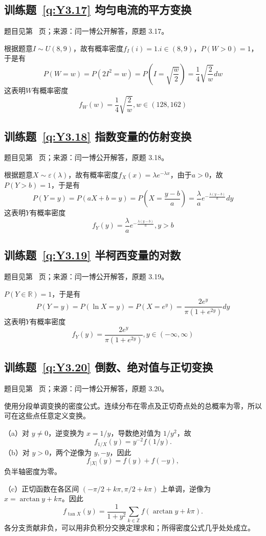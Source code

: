 \documentclass[UTF8,12pt,a4paper,fontset=fandol]{ctexbook}
\begin{document}
\subsection*{训练题~\ref{q:Y3.17} 均匀电流的平方变换}\label{a:Y3.17}{\small 题目见第~\pageref{q:Y3.17} 页；来源：闫一博公开解答，原题 3.17。}
\begin{solve}
根据题意$I\sim U(8,9)$，故有概率密度$f_I(i)=1.i\in (8,9)$，$P(W>0)=1$，于是有
\[P(W = w) = P(2{I^2} = w) = P(I = \sqrt {\frac{w}{2}} ) = \frac{1}{4}\sqrt {\frac{2}{w}} dw\]
这表明$W$有概率密度
\[{f_W}(w) = \frac{1}{4}\sqrt {\frac{2}{w}},w\in(128,162) \]
\end{solve}

\subsection*{训练题~\ref{q:Y3.18} 指数变量的仿射变换}\label{a:Y3.18}{\small 题目见第~\pageref{q:Y3.18} 页；来源：闫一博公开解答，原题 3.18。}
\begin{solve}
根据题意$X\sim \varepsilon(\lambda)$，故有概率密度$f_X(x)=\lambda e^{-\lambda x}$，由于$a>0$，故$P(Y>b)=1$，于是有
\[P(Y = y) = P(aX + b = y) = P(X = \frac{{y - b}}{a}) = \frac{\lambda }{a}{e^{ - \frac{{\lambda (y - b)}}{a}}}dy\]
这表明$Y$有概率密度
\[{f_Y}(y) = \frac{\lambda }{a}{e^{ - \frac{{\lambda (y - b)}}{a}}},y > b\]
\end{solve}

\subsection*{训练题~\ref{q:Y3.19} 半柯西变量的对数}\label{a:Y3.19}{\small 题目见第~\pageref{q:Y3.19} 页；来源：闫一博公开解答，原题 3.19。}
\begin{solve}
$P(Y\in \mathbb{R})=1$，于是有 
\[P(Y = y) = P(\ln X = y) = P(X = {e^y}) = \frac{{2{e^y}}}{{\pi (1 + {e^{2y}})}}dy\]
这表明$Y$有概率密度
\[{f_Y}(y) = \frac{{2{e^y}}}{{\pi (1 + {e^{2y}})}},y \in ( - \infty ,\infty )\]
\end{solve}

\subsection*{训练题~\ref{q:Y3.20} 倒数、绝对值与正切变换}\label{a:Y3.20}{\small 题目见第~\pageref{q:Y3.20} 页；来源：闫一博公开解答，原题 3.20。}
\begin{solve}使用分段单调变换的密度公式。连续分布在零点及正切奇点处的总概率为零，所以可在这些点任意定义变换。\par（a）对 $y\ne0$，逆变换为 $x=1/y$，导数绝对值为 $1/y^2$，故\[f_{1/X}(y)=y^{-2}f(1/y).\]（b）对 $y>0$，两个逆像为 $y,-y$，因此\[f_{|X|}(y)=f(y)+f(-y),\]负半轴密度为零。\par（c）正切函数在各区间 $(-\pi/2+k\pi,\pi/2+k\pi)$ 上单调，逆像为 $x=\arctan y+k\pi$。因此\[f_{\tan X}(y)=\frac1{1+y^2}\sum_{k\in\mathbb Z}f(\arctan y+k\pi).\]各分支贡献非负，可以用非负积分交换定理求和；所得密度公式几乎处处成立。\end{solve}
\end{document}
